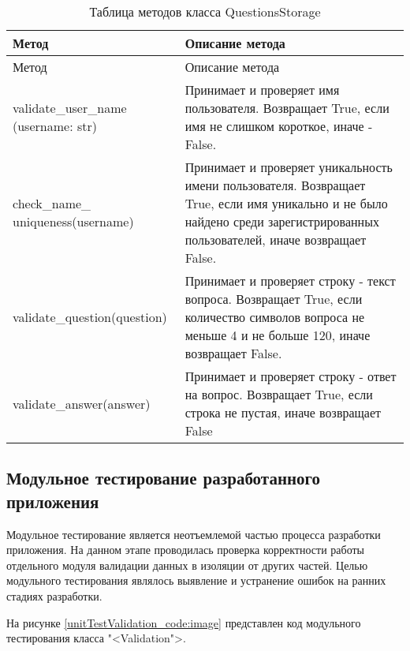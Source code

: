 \begin{xltabular}{\textwidth}{|p{6cm}|X|}
	\caption{Таблица методов класса QuestionsStorage\label{validation_functions:table}} \hline
	\centrow Метод & \centrow Описание метода \\ \hline
	\endfirsthead
	\centrow Метод & \centrow Описание метода \\ \hline
	\finishhead
	validate\_user\_name (username: str) & Принимает и проверяет имя пользователя. Возвращает True, если имя не слишком короткое, иначе - False. \\ \hline 
	check\_name\_ uniqueness(username) & Принимает и проверяет уникальность имени пользователя. Возвращает True, если имя уникально и не было найдено среди зарегистрированных пользователей, иначе возвращает False. \\ \hline
	validate\_question(question) & Принимает и проверяет строку - текст вопроса. Возвращает True, если количество символов вопроса не меньше 4 и не больше 120, иначе возвращает False. \\ \hline
	validate\_answer(answer) & Принимает и проверяет строку - ответ на вопрос. Возвращает True, если строка не пустая, иначе возвращает False
\end{xltabular}

\subsection{Модульное тестирование разработанного приложения}

Модульное тестирование является неотъемлемой частью процесса разработки приложения. На данном этапе проводилась проверка корректности работы отдельного модуля валидации данных в изоляции от других частей. Целью модульного тестирования являлось выявление и устранение ошибок на ранних стадиях разработки.

На рисунке \ref{unitTestValidation_code:image} представлен код модульного тестирования класса "<Validation">.

